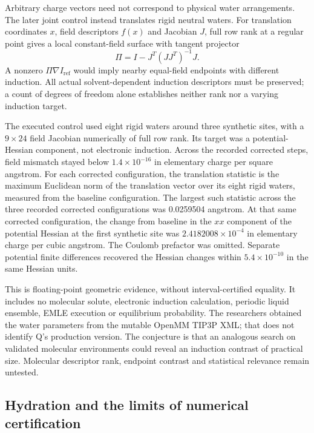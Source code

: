 \documentclass{article}
\begin{document}
Arbitrary charge vectors need not correspond to physical water arrangements. The later joint control instead translates rigid neutral waters. For translation coordinates $x$, field descriptors $f(x)$ and Jacobian $J$, full row rank at a regular point gives a local constant-field surface with tangent projector
\begin{equation*}
\Pi=I-J^T(JJ^T)^{-1}J.
\end{equation*}
A nonzero $\Pi\nabla I_{\mathrm{ref}}$ would imply nearby equal-field endpoints with different induction. All actual solvent-dependent induction descriptors must be preserved; a count of degrees of freedom alone establishes neither rank nor a varying induction target.

The executed control used eight rigid waters around three synthetic sites, with a $9\times24$ field Jacobian numerically of full row rank. Its target was a potential-Hessian component, not electronic induction. Across the recorded corrected steps, field mismatch stayed below $1.4\times10^{-16}$ in elementary charge per square angstrom. For each corrected configuration, the translation statistic is the maximum Euclidean norm of the translation vector over its eight rigid waters, measured from the baseline configuration. The largest such statistic across the three recorded corrected configurations was 0.0259504 angstrom. At that same corrected configuration, the change from baseline in the $xx$ component of the potential Hessian at the first synthetic site was $2.4182008\times10^{-4}$ in elementary charge per cubic angstrom. The Coulomb prefactor was omitted. Separate potential finite differences recovered the Hessian changes within $5.4\times10^{-10}$ in the same Hessian units.

This is floating-point geometric evidence, without interval-certified equality. It includes no molecular solute, electronic induction calculation, periodic liquid ensemble, EMLE execution or equilibrium probability. The researchers obtained the water parameters from the mutable OpenMM TIP3P XML; that does not identify Q's production version. The conjecture is that an analogous search on validated molecular environments could reveal an induction contrast of practical size. Molecular descriptor rank, endpoint contrast and statistical relevance remain untested.

\subsection{Hydration and the limits of numerical certification}
\end{document}
